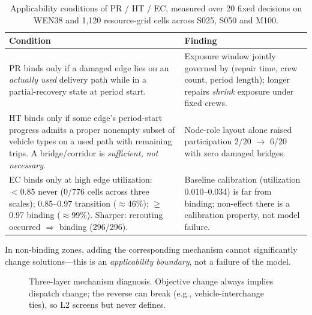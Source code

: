 \documentclass[10pt,conference,letterpaper]{IEEEtran}
\begin{document}
\begin{table}[t]
\centering
\caption{Applicability conditions of PR / HT / EC, measured over 20 fixed
decisions on WEN38 and 1{,}120 resource-grid cells across S025, S050 and
M100.}
\label{tab:applicability}
\begin{tabular}{p{}p{}}
\toprule
Condition & Finding \\
\midrule
PR binds only if a damaged edge lies on an \emph{actually used} delivery
path while in a partial-recovery state at period start. & Exposure window
jointly governed by (repair time, crew count, period length); longer
repairs \emph{shrink} exposure under fixed crews. \\
\midrule
HT binds only if some edge's period-start progress admits a proper
nonempty subset of vehicle types on a used path with remaining trips.
A bridge/corridor is \emph{sufficient, not necessary}. & Node-role layout
alone raised participation 2/20 $\to$ 6/20 with zero damaged bridges. \\
\midrule
EC binds only at high edge utilization: $<0.85$ never (0/776 cells across
three scales); 0.85--0.97 transition ($\approx$46\%); $\ge$0.97 binding
($\approx$99\%). Sharper: rerouting occurred $\Rightarrow$ binding
(296/296). & Baseline calibration (utilization 0.010--0.034) is far from
binding; non-effect there is a calibration property, not model failure. \\
\bottomrule
\end{tabular}
\end{table}

In non-binding zones, adding the corresponding mechanism cannot
significantly change solutions---this is an \emph{applicability boundary},
not a failure of the model.

\begin{figure}[t]
\centering
{}
\caption{Three-layer mechanism diagnosis. Objective change always implies
dispatch change; the reverse can break (e.g., vehicle-interchange ties),
so L2 screens but never defines.}
\label{fig:diagnosis}
\end{figure}
\end{document}
